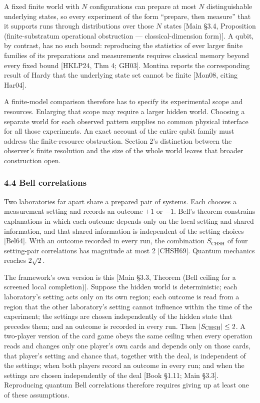 \documentclass[
]{article}
\begin{document}
A fixed finite world with \(N\) configurations can prepare at most \(N\)
distinguishable underlying states, so every experiment of the form
``prepare, then measure'' that it supports runs through distributions
over those \(N\) states {[}Main §3.4, Proposition (finite-substratum
operational obstruction --- classical-dimension form){]}. A qubit, by
contrast, has no such bound: reproducing the statistics of ever larger
finite families of its preparations and measurements requires classical
memory beyond every fixed bound {[}HKLP24, Thm 4; GH03{]}. Montina
reports the corresponding result of Hardy that the underlying state set
cannot be finite {[}Mon08, citing Har04{]}.

A finite-model comparison therefore has to specify its experimental
scope and resources. Enlarging that scope may require a larger hidden
world. Choosing a separate world for each observed pattern supplies no
common physical interface for all those experiments. An exact account of
the entire qubit family must address the finite-resource obstruction.
Section 2's distinction between the observer's finite resolution and the
size of the whole world leaves that broader construction open.

\hypertarget{bell-correlations}{%
\subsubsection{4.4 Bell correlations}\label{bell-correlations}}

Two laboratories far apart share a prepared pair of systems. Each
chooses a measurement setting and records an outcome \(+1\) or \(-1\).
Bell's theorem constrains explanations in which each outcome depends
only on the local setting and shared information, and that shared
information is independent of the setting choices {[}Bel64{]}. With an
outcome recorded in every run, the combination \(S_{\mathrm{CHSH}}\) of
four setting-pair correlations has magnitude at most 2 {[}CHSH69{]}.
Quantum mechanics reaches \(2\sqrt2\).

The framework's own version is this {[}Main §3.3, Theorem (Bell ceiling
for a screened local completion){]}. Suppose the hidden world is
deterministic; each laboratory's setting acts only on its own region;
each outcome is read from a region that the other laboratory's setting
cannot influence within the time of the experiment; the settings are
chosen independently of the hidden state that precedes them; and an
outcome is recorded in every run. Then \(|S_{\rm CHSH}|\le2\). A
two-player version of the card game obeys the same ceiling when every
operation reads and changes only one player's own cards and depends only
on those cards, that player's setting and chance that, together with the
deal, is independent of the settings; when both players record an
outcome in every run; and when the settings are chosen independently of
the deal {[}Book §1.11; Main §3.3{]}. Reproducing quantum Bell
correlations therefore requires giving up at least one of these
assumptions.
\end{document}
